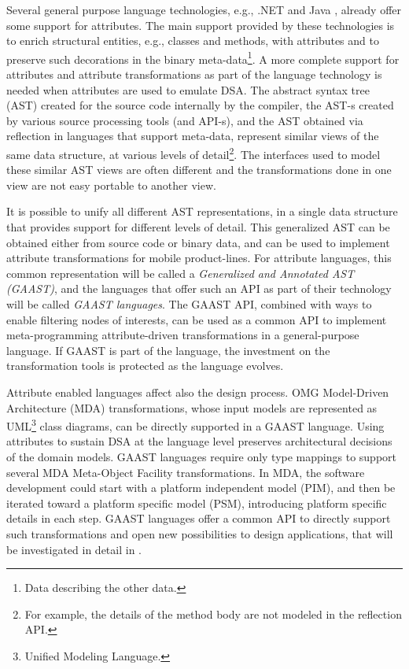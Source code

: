 Several general purpose language technologies, e.g., .NET \cite{www.dotnet} and Java \cite{www.java}, already offer some support for attributes. The main support provided by these technologies is to enrich structural entities, e.g., classes and methods, with attributes and to preserve such decorations in the binary meta-data\footnote{Data describing the other data.}. A more complete support for attributes and attribute transformations as part of the language technology is needed when attributes are used to emulate DSA. The abstract syntax tree (AST) created for the source code internally by the compiler, the AST-s created by various source processing tools (and API-s), and the AST obtained via reflection in languages that support meta-data, represent similar views of the same data structure, at various levels of detail\footnote{For example, the details of the method body are not modeled in the reflection API.}. The interfaces used to model these similar AST views are often different and the transformations done in one view are not easy portable to another view.

It is possible to unify all different AST representations, in a single data structure that provides support for different levels of detail. This generalized AST can be obtained either from source code or binary data, and can be used to implement attribute transformations for mobile product-lines. For attribute languages, this common representation will be called a \textit{Generalized and Annotated AST (GAAST)}, and the languages that offer such an API as part of their technology will be called \textit{GAAST languages}. The GAAST API, combined with ways to enable filtering nodes of interests, can be used as a common API to implement meta-programming attribute-driven transformations in a general-purpose language. If GAAST is part of the language, the investment on the transformation tools is protected as the language evolves.

Attribute enabled languages affect also the design \cite{design.attrib} process. OMG Model-Driven Architecture (MDA) \cite{mda.frankel} transformations, whose input models are represented as UML\footnote{Unified Modeling Language.} class diagrams, can be directly supported in a GAAST language. Using attributes to sustain DSA at the language level preserves architectural decisions of the domain models. GAAST languages require only type mappings to support several MDA Meta-Object Facility transformations. In MDA, the software development could start with a platform independent model (PIM), and then be iterated toward a platform specific model (PSM), introducing platform specific details in each step. GAAST languages offer a common API to directly support such transformations and open new possibilities to design applications, that will be investigated in detail in . 

